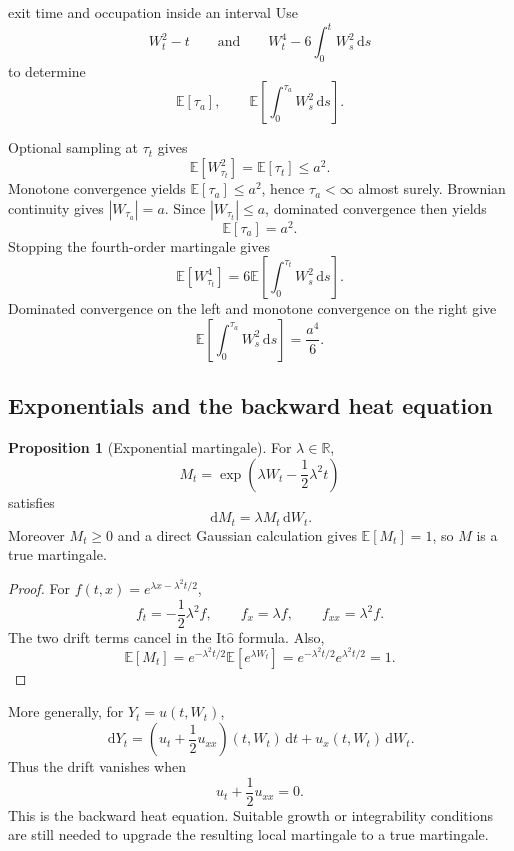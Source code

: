 \documentclass[10pt]{article}
\newcommand{\E}{\mathbb E}
\newcommand{\R}{\mathbb R}
\newcommand{\1}{\mathbf 1}
\newcommand{\dd}{\,\mathrm d}
\newcommand{\Ito}{\mathrm{It\hat{o}}}
\theoremstyle{definition}
\newtheorem{proposition}[definition]{Proposition}
\begin{document}
\begin{studentexercise}{exit time and occupation inside an interval}
Use
\[
W_t^2-t
\qquad\text{and}\qquad
W_t^4-6\int_0^tW_s^2\dd s
\]
to determine
\[
\E[\tau_a],
\qquad
\E\left[\int_0^{\tau_a}W_s^2\dd s\right].
\]
\end{studentexercise}
\begin{shortsolution}
Optional sampling at \(\tau_t\) gives
\[
\E[W_{\tau_t}^2]=\E[\tau_t]\leq a^2.
\]
Monotone convergence yields \(\E[\tau_a]\leq a^2\), hence
\(\tau_a<\infty\) almost surely. Brownian continuity gives
\(|W_{\tau_a}|=a\). Since \(|W_{\tau_t}|\leq a\), dominated convergence
then yields
\[
\boxed{\E[\tau_a]=a^2.}
\]
Stopping the fourth-order martingale gives
\[
\E[W_{\tau_t}^4]
=6\E\left[\int_0^{\tau_t}W_s^2\dd s\right].
\]
Dominated convergence on the left and monotone convergence on the right give
\[
\boxed{
\E\left[\int_0^{\tau_a}W_s^2\dd s\right]=\frac{a^4}{6}.}
\]
\end{shortsolution}

\subsection{Exponentials and the backward heat equation}

\begin{proposition}[Exponential martingale]
For \(\lambda\in\R\),
\[
M_t=\exp\left(\lambda W_t-\frac12\lambda^2t\right)
\]
satisfies
\[
\dd M_t=\lambda M_t\dd W_t.
\]
Moreover \(M_t\geq0\) and a direct Gaussian calculation gives
\(\E[M_t]=1\), so \(M\) is a true martingale.
\end{proposition}

\begin{proof}
For \(f(t,x)=e^{\lambda x-\lambda^2t/2}\),
\[
f_t=-\frac12\lambda^2f,\qquad
f_x=\lambda f,\qquad
f_{xx}=\lambda^2f.
\]
The two drift terms cancel in the \(\Ito\) formula. Also,
\[
\E[M_t]
=e^{-\lambda^2t/2}\E[e^{\lambda W_t}]
=e^{-\lambda^2t/2}e^{\lambda^2t/2}=1.
\]
\end{proof}

More generally, for \(Y_t=u(t,W_t)\),
\[
\dd Y_t
=\left(u_t+\frac12u_{xx}\right)(t,W_t)\dd t
+u_x(t,W_t)\dd W_t.
\]
Thus the drift vanishes when
\[
\boxed{u_t+\frac12u_{xx}=0.}
\]
This is the backward heat equation. Suitable growth or integrability
conditions are still needed to upgrade the resulting local martingale to a
true martingale.
\end{document}
